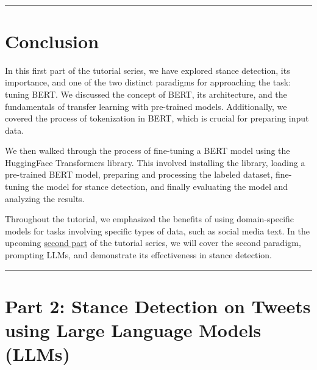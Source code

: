 \documentclass[11pt]{article}
\begin{document}
    \begin{center}
    \end{center}
    { \hspace*{\fill} \\}
    
    \begin{center}\rule{0.5\linewidth}{0.5pt}\end{center}

    \hypertarget{conclusion}{%
\section{Conclusion}\label{conclusion}}

    In this first part of the tutorial series, we have explored stance
detection, its importance, and one of the two distinct paradigms for
approaching the task: tuning BERT. We discussed the concept of BERT, its
architecture, and the fundamentals of transfer learning with pre-trained
models. Additionally, we covered the process of tokenization in BERT,
which is crucial for preparing input data.

We then walked through the process of fine-tuning a BERT model using the
HuggingFace Transformers library. This involved installing the library,
loading a pre-trained BERT model, preparing and processing the labeled
dataset, fine-tuning the model for stance detection, and finally
evaluating the model and analyzing the results.

Throughout the tutorial, we emphasized the benefits of using
domain-specific models for tasks involving specific types of data, such
as social media text. In the upcoming
\href{https://colab.research.google.com/drive/1IFr6Iz1YH9XBWUKcWZyTU-1QtxgYqrmX?usp=sharing}{second
part} of the tutorial series, we will cover the second paradigm,
prompting LLMs, and demonstrate its effectiveness in stance detection.
    

    
    \hypertarget{stance-detection-on-tweets-using-nlp-methods---part-2}{%

    \begin{center}\rule{\linewidth}{0.5pt}\end{center}
    
\section{Part 2: Stance Detection on Tweets using Large Language Models (LLMs)}\label{stance-detection-on-tweets-using-nlp-methods---part-2}}
\end{document}
